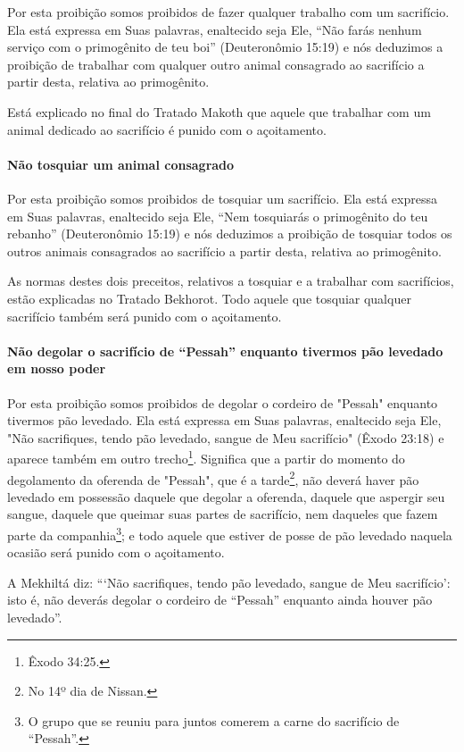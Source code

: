 Por esta proibição somos proibidos de fazer qualquer trabalho com um
sacrifício. Ela está expressa em Suas palavras, enaltecido seja Ele,
``Não farás nenhum serviço com o primogênito de teu boi'' (Deuteronômio
15:19) e nós deduzimos a proibição de trabalhar com qualquer outro
animal consagrado ao sacrifício a partir desta, relativa ao
primogênito.

Está explicado no final do Tratado Makoth que aquele que trabalhar com
um animal dedicado ao sacrifício é punido com o açoitamento.

\paragraph{Não tosquiar um animal consagrado}

Por esta proibição somos proibidos de tosquiar um sacrifício. Ela está
expressa em Suas palavras, enaltecido seja Ele, ``Nem tosquiarás o
primogênito do teu rebanho'' (Deuteronômio 15:19) e nós deduzimos a
proibição de tosquiar todos os outros animais consagrados ao sacrifício
a partir desta, relativa ao primogênito.

As normas destes dois preceitos, relativos a tosquiar e a trabalhar com
sacrifícios, estão explicadas no Tratado Bekhorot. Todo aquele que
tosquiar qualquer sacrifício também será punido com o açoitamento.

\paragraph{Não degolar o sacrifício de ``Pessah'' enquanto tivermos pão
levedado em nosso poder}

Por esta proibição somos proibidos de degolar o cordeiro de "Pessah"
enquanto tivermos pão levedado. Ela está expressa em Suas palavras,
enaltecido seja Ele, "Não sacrifiques, tendo pão levedado, sangue de
Meu sacrifício" (Êxodo 23:18) e aparece também em outro
trecho\footnote{Êxodo 34:25.}. Significa que a partir do momento do
degolamento da oferenda de "Pessah", que é a
tarde\footnote{No 14º dia de Nissan.}, não deverá haver pão levedado em possessão
daquele que degolar a oferenda, daquele que aspergir seu sangue, daquele
que queimar suas partes de sacrifício, nem daqueles que fazem parte da
companhia\footnote{O grupo que se reuniu para juntos comerem a carne do sacrifício de
  ``Pessah''.}; e todo aquele que estiver de posse de
pão levedado naquela ocasião será punido com o açoitamento.

A Mekhiltá diz: ```Não sacrifiques, tendo pão levedado, sangue de Meu
sacrifício': isto é, não deverás degolar o cordeiro de ``Pessah''
enquanto ainda houver pão levedado''.

